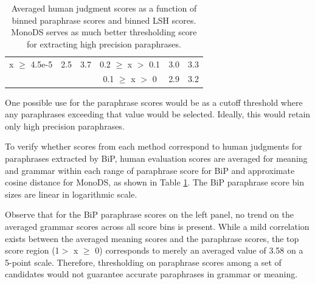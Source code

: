 \documentclass[11pt]{article}
\begin{document}
\begin{table}
\begin{center}
\begin{tabular}{ccc|ccc}
{\scriptsize x $\ge$ 4.5e-5} & {\scriptsize 2.5} & {\scriptsize 3.7} & {\scriptsize 0.2 $\geq$ x $>$ 0.1} & {\scriptsize 3.0} & {\scriptsize 3.3} \\
&&& {\scriptsize 0.1 $\geq$ x $>$ 0} & {\scriptsize 2.9} & {\scriptsize 3.2} \\
\hline
\end{tabular}
\end{center}
\caption{Averaged human judgment scores as a function of binned paraphrase scores and binned LSH scores. %
MonoDS serves as much better thresholding score for extracting high precision paraphrases.}
\label{table9}
\end{table}


One possible use for the paraphrase scores would be as a cutoff threshold where any paraphrases exceeding that value would be selected. Ideally, this would retain only high precision paraphrases.

To verify whether scores from each method correspond to human judgments for paraphrases extracted by BiP, human evaluation scores are averaged for meaning and grammar within each range of paraphrase score for BiP and approximate cosine distance for MonoDS, as shown in Table \ref{table9}. The BiP paraphrase score bin sizes are linear in logarithmic scale. 


Observe that for the BiP paraphrase scores on the left panel, no trend on the averaged grammar scores across all score bins is present. While a mild correlation exists between the averaged meaning scores and the paraphrase scores, the top score region (1$>$ x $\ge$ 0) corresponds to merely an averaged value of 3.58 on a 5-point scale. Therefore, thresholding on paraphrase scores among a set of candidates would not guarantee accurate paraphrases in grammar or meaning.
\end{document}
